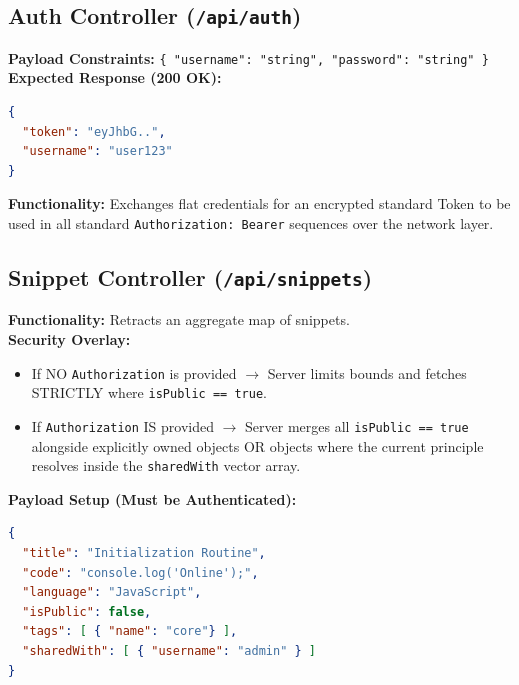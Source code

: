 \documentclass[12pt,a4paper]{article}
\begin{document}
\subsection{Auth Controller (\texttt{/api/auth})}
\begin{tcolorbox}[colback=white,colframe=cerulean,title=\texttt{POST /api/auth/login}]
\textbf{Payload Constraints:} \texttt{\{ "username": "string", "password": "string" \}}\\
\textbf{Expected Response (200 OK):}
\begin{lstlisting}[language=json]
{
  "token": "eyJhbG..", 
  "username": "user123"
}
\end{lstlisting}
\textbf{Functionality:} Exchanges flat credentials for an encrypted standard Token to be used in all standard \texttt{Authorization: Bearer} sequences over the network layer.
\end{tcolorbox}

\subsection{Snippet Controller (\texttt{/api/snippets})}

\begin{tcolorbox}[colback=white,colframe=cerulean,title=\texttt{GET /api/snippets}]
\textbf{Functionality:} Retracts an aggregate map of snippets.\\
\textbf{Security Overlay:} 
\begin{itemize}
    \item If NO \texttt{Authorization} is provided $\rightarrow$ Server limits bounds and fetches STRICTLY where \texttt{isPublic == true}. 
    \item If \texttt{Authorization} IS provided $\rightarrow$ Server merges all \texttt{isPublic == true} alongside explicitly owned objects OR objects where the current principle resolves inside the \texttt{sharedWith} vector array.
\end{itemize}
\end{tcolorbox}

\begin{tcolorbox}[colback=white,colframe=cerulean,title=\texttt{POST /api/snippets}]
\textbf{Payload Setup (Must be Authenticated):}
\begin{lstlisting}[language=json]
{
  "title": "Initialization Routine",
  "code": "console.log('Online');",
  "language": "JavaScript",
  "isPublic": false,
  "tags": [ { "name": "core"} ],
  "sharedWith": [ { "username": "admin" } ]
}
\end{lstlisting}
\end{tcolorbox}
\end{document}
